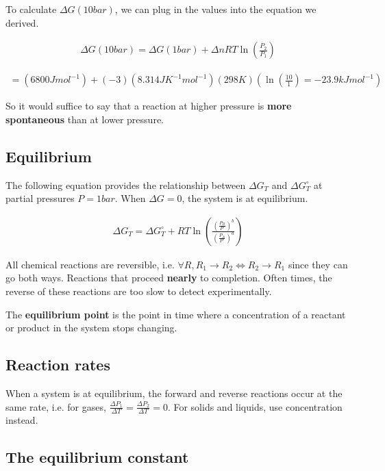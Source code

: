 \documentclass[12pt]{book}
\begin{document}
To calculate $\Delta G(10 bar)$, we can plug in the values into the equation we derived.

\begin{align*}
    \Delta G(10 bar)=\Delta G(1 bar)+\Delta nRT\ln\left(\frac{P_2}{P_1}\right)
\end{align*}

\begin{align*}
    =(6800Jmol^{-1})+(-3)(8.314JK^{-1}mol^{-1})(298K)(\ln\left(\frac{10}{1}\right)=-23.9kJmol^{-1})
\end{align*}

So it would suffice to say that a reaction at higher pressure is \textbf{more spontaneous} than at lower pressure.

\subsection*{Equilibrium}

The following equation provides the relationship between $\Delta G_T$ and $\Delta G_T^{\circ}$ at partial pressures $P=1bar$. When $\Delta G=0$, the system is at equilibrium.

\begin{align*}
    \Delta G_T=\Delta G_T^{\circ}+RT\ln\left(\frac{\left(\frac{P_B}{P^{\circ}}\right)^b}{\left(\frac{P_A}{P^{\circ}}\right)^a}\right)
\end{align*}

All chemical reactions are reversible, i.e. $\forall R, R_1\rightarrow R_2\iff R_2\rightarrow R_1$ since they can go both ways. Reactions that proceed \textbf{nearly} to completion. Often times, the reverse of these reactions are too slow to detect experimentally.

The \textbf{equilibrium point} is the point in time where a concentration of a reactant or product in the system stops changing.

\subsection*{Reaction rates}

When a system is at equilibrium, the forward and reverse reactions occur at the same rate, i.e. for gases, $\frac{\Delta P_1}{\Delta T}=\frac{\Delta P_2}{\Delta T}=0$. For solids and liquids, use concentration instead.

\subsection*{The equilibrium constant}
\end{document}
